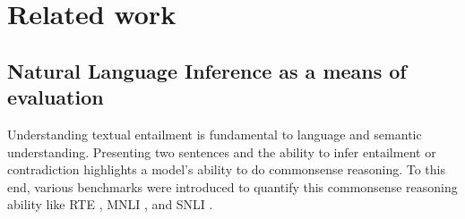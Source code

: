 \section{Related work}


\subsection{Natural Language Inference as a means of evaluation}
\label{related:benchmarks}


Understanding textual entailment is fundamental to language and semantic understanding. Presenting two sentences and the ability to infer entailment or contradiction highlights a model's ability to do commonsense reasoning. To this end, various benchmarks were introduced to quantify this commonsense reasoning ability like RTE \citep{dagan2005pascal}, MNLI \citep{williams-etal-2018-broad}, and SNLI \citep{bowman-etal-2015-large}.

% 

